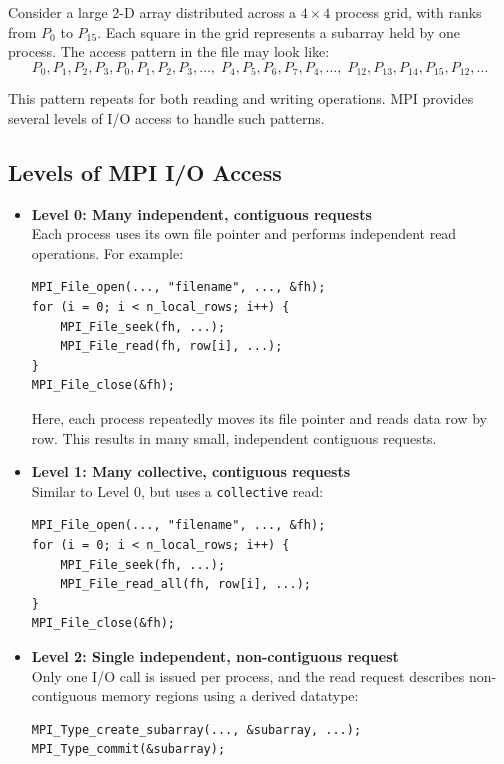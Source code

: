 \documentclass[12pt]{book}
\begin{document}
Consider a large 2-D array distributed across a $4 \times 4$ process grid, with ranks from $P_0$ to $P_{15}$. Each square in the grid represents a subarray held by one process. The access pattern in the file may look like:
\[
P_0, P_1, P_2, P_3, P_0, P_1, P_2, P_3, \ldots,\;
P_4, P_5, P_6, P_7, P_4, \ldots,\;
P_{12}, P_{13}, P_{14}, P_{15}, P_{12}, \ldots
\]

This pattern repeats for both reading and writing operations. MPI provides several levels of I/O access to handle such patterns.

\subsection*{Levels of MPI I/O Access}

\begin{itemize}
    \item \textbf{Level 0: Many independent, contiguous requests} \\
    Each process uses its own file pointer and performs independent read operations. For example:
    \begin{lstlisting}[style=cppstyle]
MPI_File_open(..., "filename", ..., &fh);
for (i = 0; i < n_local_rows; i++) {
    MPI_File_seek(fh, ...);
    MPI_File_read(fh, row[i], ...);
}
MPI_File_close(&fh);
    \end{lstlisting}
    Here, each process repeatedly moves its file pointer and reads data row by row. This results in many small, independent contiguous requests.

    \item \textbf{Level 1: Many collective, contiguous requests} \\
    Similar to Level 0, but uses a \texttt{collective} read:
    \begin{lstlisting}[style=cppstyle]
MPI_File_open(..., "filename", ..., &fh);
for (i = 0; i < n_local_rows; i++) {
    MPI_File_seek(fh, ...);
    MPI_File_read_all(fh, row[i], ...);
}
MPI_File_close(&fh);
    \end{lstlisting}

    \item \textbf{Level 2: Single independent, non-contiguous request} \\
    Only one I/O call is issued per process, and the read request describes non-contiguous memory regions using a derived datatype:
    \begin{lstlisting}[style=cppstyle]
MPI_Type_create_subarray(..., &subarray, ...);
MPI_Type_commit(&subarray);


\end{lstlisting}
\end{itemize}
\end{document}
